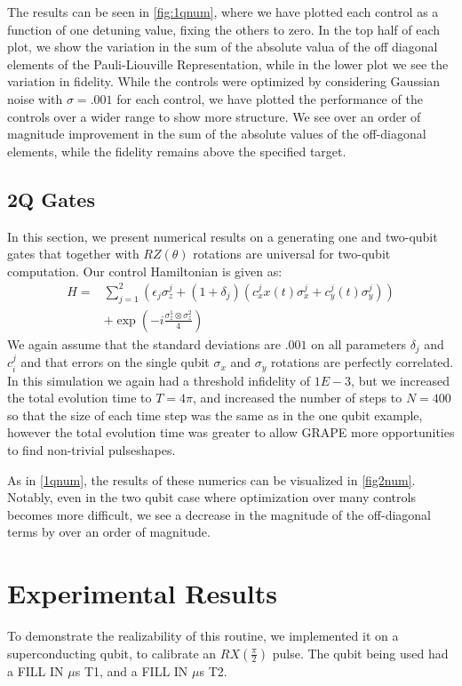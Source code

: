 \documentclass[aps,nofootinbib,pra,notitlepage,twocolumn]{revtex4-1}
\begin{document}
The results can be seen in \ref{fig:1qnum}, where we have plotted each control as a function of one detuning value, fixing the others to zero. In the top half of each plot, we show the variation in the sum of the absolute valua of the off diagonal elements of the Pauli-Liouville Representation, while in the lower plot we see the variation in fidelity. While the controls were optimized by considering Gaussian noise with $\sigma=.001$ for each control, we have plotted the performance of the controls over a wider range to show more structure. We see over an order of magnitude improvement in the sum of the absolute values of the off-diagonal elements, while the fidelity remains above the specified target.



\subsection{2Q Gates}\label{2Q Gates}
 In this section, we present numerical results on a generating one and two-qubit gates that together with $RZ(\theta)$ rotations are universal for two-qubit computation. Our control Hamiltonian is given as: 
\begin{equation} \label{eq:2Qham}
\begin{split}
H = &\sum_{j=1}^2(\epsilon_j\sigma_z^j + (1 + \delta_j)(c_x^jx(t)\sigma_x^j + c_y^j(t)\sigma_y^j)) \\
&+ \exp{(-i\frac{\sigma_z^1\otimes\sigma_z^2}{4})} 
\end{split}
\end{equation}
We again assume that the standard deviations are $.001$ on all parameters $\delta_j$ and $c^j_i$ and that errors on the single qubit $\sigma_x$ and $\sigma_y$ rotations are perfectly correlated. In this simulation we again had a threshold infidelity of $1E-3$, but we increased the total evolution time to $T=4\pi$, and increased the number of steps to $N=400$ so that the size of each time step was the same as in the one qubit example, however the total evolution time was greater to allow GRAPE more opportunities to find non-trivial pulseshapes. 

As in \ref{1qnum}, the results of these numerics can be visualized in \ref{fig2num}. Notably, even in the two qubit case where optimization over many controls becomes more difficult, we see a decrease in the magnitude of the off-diagonal terms by over an order of magnitude.


\section{Experimental Results}\label{experimental}
To demonstrate the realizability of this routine, we implemented it on a superconducting qubit, to calibrate an $RX(\frac{\pi}{2})$ pulse. The qubit being used had a FILL IN $\mu$s T1, and a FILL IN $\mu$s T2.
\end{document}
